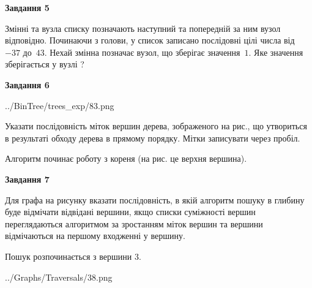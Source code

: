 \documentclass[12pt, ukrainian]{article}
\begin{document}
{\begin {large}
{\begin {center}\textbf{Завдання 5}\end {center}}\par
Змінні  та  вузла списку позначають наступний та попередній за ним вузол відповідно. Починаючи з голови, у список записано послідовні цілі числа від~$-37$ до~$43$. Нехай змінна  позначає вузол, що зберігає значення~$1$.
Яке значення зберігається у вузлі  ?\par
\newpage

{\begin {center}\textbf{Завдання 6}\end {center}}\par

\begin{center}
	{../BinTree/trees_exp/83.png}
\end{center}
Указати послідовність міток вершин дерева, зображеного на рис., що утвориться в результаті обходу дерева в прямому порядку. Мітки записувати через пробіл.\par Алгоритм починає роботу з кореня (на рис. це верхня вершина).\par
\newpage

{\begin {center}\textbf{Завдання 7}\end {center}}\par
Для графа на рисунку вказати послідовність, в якій алгоритм пошуку в глибину буде відмічати відвідані вершини, якщо списки суміжності вершин переглядаються алгоритмом за зростанням міток вершин та вершини відмічаються на першому вход\-женні у вершину.\par
Пошук розпочинається з вершини 3.\par

\begin{center}
	{../Graphs/Traversals/38.png}
\end{center}\par
\newpage


\end{large}}
\end{document}
